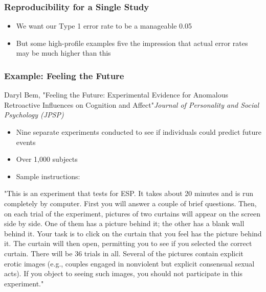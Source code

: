 \documentclass[10pt, block=fill]{beamer}
\begin{document}
\begin{frame}
  \frametitle{Reproducibility for a Single Study}
  
  \begin{itemize}
    \item We want our Type 1 error rate to be a manageable 0.05
    \item But some high-profile examples five the impression that actual error rates may be much higher than this
  \end{itemize}
    
\end{frame}

\begin{frame}
  \frametitle{Example: Feeling the Future}
  Daryl Bem, "Feeling the Future: Experimental Evidence for Anomalous Retroactive Influences on Cognition and Affect"\textit{Journal of Personality and Social Psychology (JPSP)}
  \begin{itemize}
    \item Nine separate experiments conducted to see if individuals could predict future events
    \item Over 1,000 subjects
    \item Sample instructions:
  \end{itemize}

  \tiny{"This is an experiment that tests for ESP. It takes about 20 minutes and is run completely by computer. First you will answer a couple of brief questions. Then, on each trial of the experiment, pictures of two curtains will appear on the screen side by side. One of them has a picture behind it; the other has a blank wall behind it. Your task is to click on the curtain that you feel has the picture behind it. The curtain will then open, permitting you to see if you selected the correct curtain. There will be 36 trials in all. Several of the pictures contain explicit erotic images (e.g., couples engaged in nonviolent but explicit consensual sexual acts). If you object to seeing such images, you should not participate in this experiment."}

\end{frame}
\end{document}
